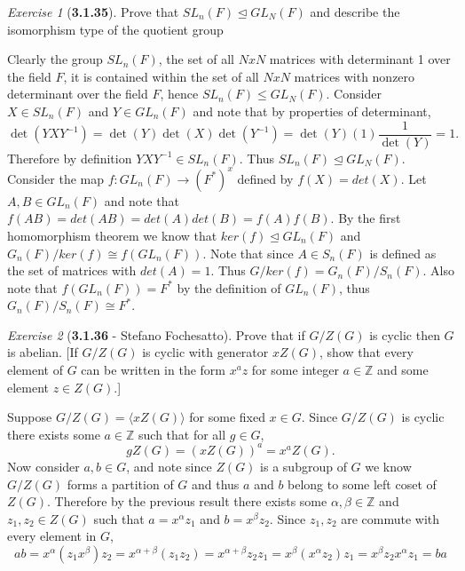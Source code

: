 \documentclass[12pt]{amsart}
\makeatletter
\theoremstyle{remark}
\newtheorem*{exercise}{Exercise}%
\def\ZZ{\ensuremath{\mathbb Z}}
\renewenvironment{proof}[1][\proofname]{\par\doublespacing
  \pushQED{\qed}%
  \normalfont \topsep6\p@\@plus6\p@\relax
  \list{}{%
    \settowidth{\leftmargin}{\itshape\proofname:\hskip\labelsep}%
    \setlength{\labelwidth}{0pt}%
    \setlength{\itemindent}{-\leftmargin}%
  }%
  \item[\hskip\labelsep\itshape#1\@addpunct{:}]\ignorespaces
}{%
  \popQED\endlist\@endpefalse
  \singlespacing
}
\theoremstyle{mycomment}
\makeatother
\begin{document}
\begin{exercise}[\textbf{3.1.35}]  Prove that $SL_n(F) \trianglelefteq GL_N(F)$ and describe the isomorphism 
  type of the quotient group
  \begin{proof} Clearly the group $SL_n(F)$, the set of all $NxN$ matrices with determinant 1 over the field $F$, it is contained within the 
    set of all $NxN$ matrices with nonzero determinant over the field $F$, hence $SL_n(F) \leq GL_N(F)$. Consider $X \in SL_n(F)$ and $Y \in GL_n(F)$ and note that by properties of determinant, 
    \begin{equation*}
      \det(YXY^{-1}) = \det(Y)\det(X)\det(Y^{-1}) = \det(Y)(1)\dfrac{1}{\det(Y)} = 1.
    \end{equation*}
    Therefore by definition $YXY^{-1} \in SL_n(F)$. Thus $SL_n(F) \trianglelefteq GL_N(F)$.\\
    Consider the map $f: GL_n(F) \to (F^*)^x$ defined by $f(X) = det(X)$. Let $A, B \in GL_n(F)$ and note that $f(AB) = det(AB) = det(A)det(B) = f(A)f(B)$. By the first homomorphism theorem we know that $ker(f) \trianglelefteq GL_n(F)$ and $G_n(F)/ker(f) \cong f(GL_n(F))$. Note that since $A \in S_n(F)$ is defined as the set of matrices with $det(A) = 1$. Thus $G/ker(f) = G_n(F)/S_n(F)$. Also note that $f(GL_n(F)) = F^*$ by the definition of $GL_n(F)$, thus $G_n(F)/S_n(F) \cong F^*$. 
  \end{proof}

\end{exercise}
\vspace{.15in}


\begin{exercise}[\textbf{3.1.36} - Stefano Fochesatto] Prove that if $G/Z(G)$ is cyclic then $G$ is abelian. [If $G/Z(G)$ is cyclic 
  with generator $xZ(G)$, show that every element of $G$ can be written in the form $x^az$ for some integer $a \in \ZZ$ and some element $z \in Z(G)$.]
  \begin{proof} Suppose $G/Z(G) = \langle  xZ(G)\rangle$ for some fixed $x \in G$. Since $G/Z(G)$ is cyclic there exists some $a \in \ZZ$ such that for all $g \in G$, 
    \begin{equation*}
      gZ(G) = (xZ(G))^a = x^aZ(G). 
    \end{equation*}
    Now consider $a, b \in G$, and note since $Z(G)$ is a subgroup of $G$ we know $G/Z(G)$ forms a partition of $G$ and thus 
    $a$ and $b$ belong to some left coset of $Z(G)$. Therefore by the previous result there exists some 
    $\alpha, \beta \in \ZZ$ and $z_1, z_2 \in Z(G)$ such that $a = x^{\alpha}z_1$ and $b = x^{\beta}z_2$. Since $z_1, z_2$ are commute with every element in $G$, 
    \begin{equation*}
      ab = x^{\alpha}(z_1x^{\beta})z_2 = x^{\alpha + \beta}(z_1z_2) = x^{\alpha + \beta}z_2z_1 = x^{\beta}(x^{\alpha}z_2)z_1 = x^{\beta}z_2x^{\alpha}z_1 = ba
    \end{equation*}
  \end{proof}
\end{exercise}
\vspace{.15in}
\end{document}
